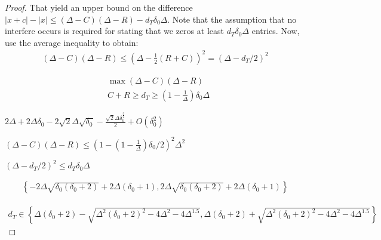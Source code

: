 \begin{proof}
That yield an upper bound on the difference $|x +c| - |x| \le  \left( \Delta -C \right) \left( \Delta -R \right) -  d_{T}\delta_{0}\Delta $. Note that the assumption that no interfere occurs is required for stating that we zeros at least $d_{T}\delta_{0}\Delta$ entries. Now, use the average inequality to obtain:   
\begin{equation*}
  \begin{split}
    \left( \Delta -C \right) \left( \Delta -R \right)  \le \left( \Delta - \frac{1}{2}\left( R+C \right)  \right)^{2}   = \left( \Delta - d_{T}/2 \right)^{2}
  \end{split}
\end{equation*}

\begin{equation*}
  \begin{split}
    & \max \left( \Delta - C \right)\left( \Delta - R  \right) \\ 
    & C + R \ge d_{T} \ge \left( 1 - \frac{1}{\Delta} \right)\delta_{0}\Delta
  \end{split}
\end{equation*}

$2 \Delta + 2 \Delta \delta_{0} - 2 \sqrt{2} \Delta \sqrt{\delta_{0}} - \frac{\sqrt{2} \Delta \delta_{0}^{\frac{3}{2}}}{2} + O\left(\delta_{0}^{2}\right)$

$\left( \Delta - C \right)\left( \Delta - R  \right) \le \left(1 - \left( 1 - \frac{1}{\Delta} \right)\delta_{0}/2  \right)^{2}\Delta^{2}$ 

$ \left( \Delta -d_{T}/2  \right)^{2} \le d_{T}\delta_{0}\Delta $


\begin{equation*}
  \begin{split}
    \left\{- 2 \Delta \sqrt{\delta_{0} \left(\delta_{0} + 2\right)} + 2 \Delta \left(\delta_{0} + 1\right), 2 \Delta \sqrt{\delta_{0} \left(\delta_{0} + 2\right)} + 2 \Delta \left(\delta_{0} + 1\right)\right\}
  \end{split}
\end{equation*}

\begin{equation*}
  \begin{split}
    d_{T} \in  \left\{\Delta \left(\delta_{0} + 2\right) - \sqrt{\Delta^{2} \left(\delta_{0} + 2\right)^{2} - 4 \Delta^{2} - 4 \Delta^{1.5}}, \Delta \left(\delta_{0} + 2\right) + \sqrt{\Delta^{2} \left(\delta_{0} + 2\right)^{2} - 4 \Delta^{2} - 4 \Delta^{1.5}}\right\}
  \end{split}
\end{equation*}


\end{proof}
